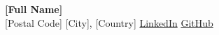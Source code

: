 \begin{center}
  {\Large \textbf{[Full Name]}}\\[0.45em]
  {\normalsize
  [Postal Code] [City], [Country] \quad\textbar{} \quad\textbar{} \quad\textbar\quad
  \href{https://www.linkedin.com}{LinkedIn} \quad\textbar\quad
  \href{https://github.com}{GitHub}}
\end{center}
\vspace{0.35em}

